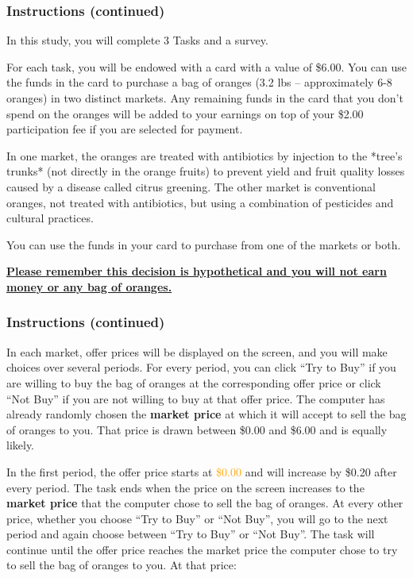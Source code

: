 \documentclass[12pt]{article}
\begin{document}
{\clearpage

\subsubsection*{\textbf{Instructions (continued)}}

In this study, you will complete 3 Tasks and a survey.

For each task, you will be endowed with a card with a value of \$6.00. You can use the funds in the card to purchase a bag of oranges (3.2 lbs – approximately 6-8 oranges) in two distinct markets. Any remaining funds in the card that you don’t spend on the oranges will be added to your earnings on top of your \$2.00 participation fee if you are selected for payment.

In one market, the oranges are treated with antibiotics by injection to the *tree’s trunks* (not directly in the orange fruits) to prevent yield and fruit quality losses caused by a disease called citrus greening. The other market is conventional oranges, not treated with antibiotics, but using a combination of pesticides and cultural practices.

You can use the funds in your card to purchase from one of the markets or both.

 
\textbf{\underline{Please remember this decision is hypothetical and you will not earn money or any bag of oranges.}}

\clearpage

\subsubsection*{\textbf{Instructions (continued)}}

 In each market, offer prices will be displayed on the screen, and you will make choices over several periods. For every period, you can click “Try to Buy” if you are willing to buy the bag of oranges at the corresponding offer price or click “Not Buy” if you are not willing to buy at that offer price.
The computer has already randomly chosen the \textbf{market price} at which it will accept to sell the bag of oranges to you. That price is drawn between \$0.00 and \$6.00 and is equally likely.

In the first period, the offer price starts at \textcolor{orange}{\$0.00 }and will increase by \$0.20 after every period. The task ends when the price on the screen increases to the \textbf{market price} that the computer chose to sell the bag of oranges.
At every other price, whether you choose “Try to Buy” or “Not Buy”, you will go to the next period and again choose between “Try to Buy” or “Not Buy”.
The task will continue until the offer price reaches the market price the computer chose to try to sell the bag of oranges to you. At that price:

}
\end{document}
